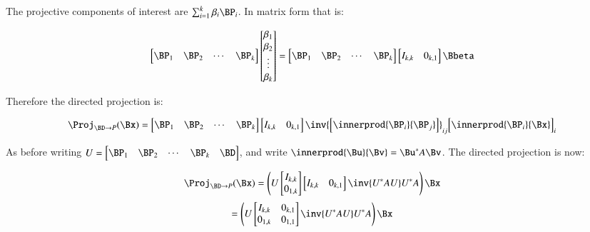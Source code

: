 The projective components of interest are $\sum_{i=1}^k \beta_i \BP_i$.  In matrix form that is:

\begin{align*}
\begin{bmatrix}
\BP_1 & \BP_2 & \cdots & \BP_k
\end{bmatrix}
\begin{bmatrix}
\beta_1 \\
\beta_2 \\
\vdots \\
\beta_k
\end{bmatrix}
=
\begin{bmatrix}
\BP_1 & \BP_2 & \cdots & \BP_k
\end{bmatrix}
\begin{bmatrix}
I_{k,k} & 0_{k,1}
\end{bmatrix}
\Bbeta
\end{align*}

Therefore the directed projection is:

\begin{equation}
\Proj_{\BD \rightarrow P}(\Bx) 
=
\begin{bmatrix}
\BP_1 & \BP_2 & \cdots & \BP_k
\end{bmatrix}
\begin{bmatrix}
I_{k,k} & 0_{k,1}
\end{bmatrix}
\inv{
\begin{bmatrix}
\innerprod{\BP_i}{\BP_j}
\end{bmatrix}
}_{ij}
{
\begin{bmatrix}
\innerprod{\BP_i}{\Bx}
\end{bmatrix}
}_i
\end{equation}

As before writing $U = 
\begin{bmatrix}
\BP_1 & \BP_2 & \cdots & \BP_k & \BD
\end{bmatrix}
$, and write $\innerprod{\Bu}{\Bv} = \Bu^* A \Bv$.  The directed projection is now:

\begin{equation*}
\Proj_{\BD \rightarrow P}(\Bx) 
=
\left(
U 
\begin{bmatrix}
I_{k,k} \\
0_{1,k} \\
\end{bmatrix}
\begin{bmatrix}
I_{k,k} & 0_{k,1}
\end{bmatrix}
\inv{
U^* A U
}
U^* A 
\right)
\Bx
\end{equation*}
\begin{equation}
=
\left(
U 
\begin{bmatrix}
I_{k,k} & 0_{k,1} \\
0_{1,k} & 0_{1,1} \\
\end{bmatrix}
\inv{
U^* A U
}
U^* A 
\right)
\Bx
\end{equation}

